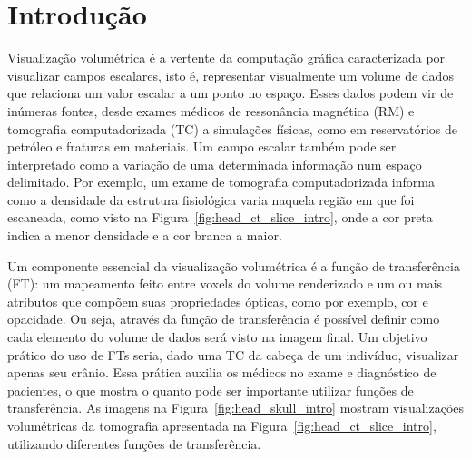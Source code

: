 
\chapter{Introdução}
\label{ch:intro}
	Visualização volumétrica é a vertente da computação gráfica caracterizada por visualizar campos escalares, isto é, representar visualmente um volume de dados que relaciona um valor escalar a um ponto no espaço. Esses dados podem vir de inúmeras fontes, desde exames médicos de ressonância magnética (RM) e tomografia computadorizada (TC) a simulações físicas, como em reservatórios de petróleo e fraturas em materiais. Um campo escalar também pode ser interpretado como a variação de uma determinada informação num espaço delimitado. Por exemplo, um exame de tomografia computadorizada informa como a densidade da estrutura fisiológica varia naquela região em que foi escaneada, como visto na Figura~\ref{fig:head_ct_slice_intro}, onde a cor preta indica a menor densidade e a cor branca a maior.
    
    Um componente essencial da visualização volumétrica é a função de transferência (FT): um mapeamento feito entre voxels do volume renderizado e um ou mais atributos que compõem suas propriedades ópticas, como por exemplo, cor e opacidade. Ou seja, através da função de transferência é possível definir como cada elemento do volume de dados será visto na imagem final. Um objetivo prático do uso de FTs seria, dado uma TC da cabeça de um indivíduo, visualizar apenas seu crânio. Essa prática auxilia os médicos no exame e diagnóstico de pacientes, o que mostra o quanto pode ser importante utilizar funções de transferência. As imagens na Figura~\ref{fig:head_skull_intro} mostram visualizações volumétricas da tomografia apresentada na Figura~\ref{fig:head_ct_slice_intro}, utilizando diferentes funções de transferência.
    
